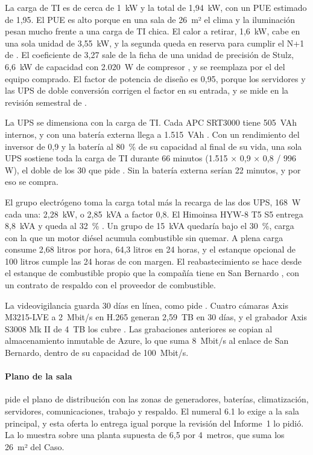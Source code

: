 La carga de TI es de cerca de 1~kW y la total de 1,94~kW, con un PUE estimado de 1,95. El PUE es alto
porque en una sala de 26~m² el clima y la iluminación pesan mucho frente a una carga de TI chica. El
calor a retirar, 1,6~kW, cabe en una sola unidad de 3,55~kW, y la segunda queda en reserva para cumplir
el N+1 de . El coeficiente de 3,27 sale de la ficha de una unidad de precisión de
Stulz, 6,6~kW de capacidad con 2.020~W de compresor \parencite{stulz_minispace}, y se reemplaza por el del
equipo comprado. El factor de potencia de diseño es 0,95, porque los servidores y las UPS de doble
conversión corrigen el factor en su entrada, y se mide en la revisión semestral de
.

La UPS se dimensiona con la carga de TI. Cada APC SRT3000 tiene 505~VAh internos, y con una batería
externa llega a 1.515~VAh \parencite{apc_srt3000}. Con un rendimiento del inversor de 0,9 y la batería al
80~\% de su capacidad al final de su vida, una sola UPS sostiene toda la carga de TI durante 66 minutos
(1.515 × 0,9 × 0,8 / 996 W), el doble de los 30 que pide . Sin la batería externa
serían 22 minutos, y por eso se compra.

El grupo electrógeno toma la carga total más la recarga de las dos UPS, 168~W cada una: 2,28~kW, o
2,85~kVA a factor 0,8. El Himoinsa HYW-8 T5 S5 entrega 8,8~kVA y queda al 32~\% \parencite{himoinsa_hyw8}.
Un grupo de 15~kVA quedaría bajo el 30~\%, carga con la que un motor diésel acumula combustible sin
quemar. A plena carga consume 2,68 litros por hora, 64,3 litros en 24 horas, y el estanque opcional de
100 litros cumple las 24 horas de  con margen. El reabastecimiento se hace desde el
estanque de combustible propio que la compañía tiene en San Bernardo , con un
contrato de respaldo con el proveedor de combustible.

La videovigilancia guarda 30 días en línea, como pide . Cuatro cámaras Axis
M3215-LVE a 2~Mbit/s en H.265 generan 2,59~TB en 30 días, y el grabador Axis S3008 Mk II de 4~TB los
cubre \parencite{axis_m3215,axis_s3008}. Las grabaciones anteriores se copian al almacenamiento inmutable
de Azure, lo que suma 8~Mbit/s al enlace de San Bernardo, dentro de su capacidad de 100~Mbit/s.

\paragraph{Plano de la sala}  pide el plano de distribución con las zonas de
generadores, baterías, climatización, servidores, comunicaciones, trabajo y respaldo. El numeral 6.1 lo
exige a la sala principal, y esta oferta lo entrega igual porque la revisión del Informe~1 lo pidió. La
 lo muestra sobre una planta supuesta de 6,5 por 4~metros, que suma los 26~m²
del Caso.

